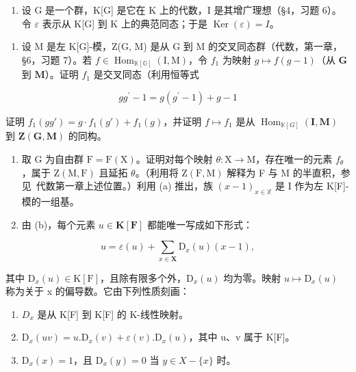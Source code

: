 \begin{enumerate}
\def\labelenumi{\arabic{enumi}.}
\setcounter{enumi}{1}
\tightlist
\item
  设 G 是一个群，K{[}G{]} 是它在 K 上的代数，I 是其增广理想（§4，习题 6）。令 \(\varepsilon\) 表示从 K{[}G{]} 到 K 上的典范同态；于是 \(\operatorname{Ker}(\varepsilon) = I\)。
\end{enumerate}

\begin{enumerate}
\def\labelenumi{(\alph{enumi})}
\tightlist
\item
  设 M 是左 K{[}G{]}-模，Z(G, M) 是从 G 到 M 的交叉同态群（代数，第一章，§6，习题 7）。若 \(f \in \operatorname{Hom}_{\mathbb{K}[\mathbb{G}]}(\mathrm{I}, \mathrm{M})\)，令 \(f_1\) 为映射 \(g \mapsto f(g - 1)\)（从 \(\mathbf{G}\) 到 \(\mathbf{M}\)）。证明 \(f_1\) 是交叉同态（利用恒等式
\end{enumerate}

\[
g g ^ {\prime} - 1 = g (g ^ {\prime} - 1) + g - 1
\]

证明 \(f_{1}(gg') = g \cdot f_{1}(g') + f_{1}(g)\)，并证明 \(f \mapsto f_{1}\) 是从 \(\operatorname{Hom}_{\mathbb{K}[G]}(\mathbf{I}, \mathbf{M})\) 到 \(\mathbf{Z}(\mathbf{G}, \mathbf{M})\) 的同构。

\begin{enumerate}
\def\labelenumi{(\alph{enumi})}
\setcounter{enumi}{1}
\item
  取 G 为自由群 \(\mathrm{F} = \mathrm{F}(\mathrm{X})\)。证明对每个映射 \(\theta: \mathrm{X} \to \mathrm{M}\)，存在唯一的元素 \(f_{\theta}\)，属于 \(\mathrm{Z}(\mathrm{M}, \mathrm{F})\) 且延拓 \(\theta\)。（利用将 \(\mathrm{Z}(\mathrm{F}, \mathrm{M})\) 解释为 F 与 M 的半直积，参见~代数第一章上述位置。）利用 (a) 推出，族 \((x - 1)_{x \in \mathbb{X}}\) 是 I 作为左 K{[}F{]}-模的一组基。
\item
  由 (b)，每个元素 \(u \in \mathbf{K}[\mathbf{F}]\) 都能唯一写成如下形式：
\end{enumerate}

\[
u = \varepsilon (u) + \sum_ {x \in \mathbf {X}} \mathrm{D} _ {x} (u) (x - 1),
\]

其中 \(\mathrm{D}_{x}(u)\in\mathrm{K}[\mathrm{F}]\)，且除有限多个外，\(\mathrm{D}_{x}(u)\) 均为零。映射 \(u\mapsto\mathrm{D}_{x}(u)\) 称为关于 x 的偏导数。它由下列性质刻画：

\begin{enumerate}
\def\labelenumi{(\roman{enumi})}
\item
  \(D_{x}\) 是从 K{[}F{]} 到 K{[}F{]} 的 K-线性映射。
\item
  \(\mathrm{D}_{x}(uv)=u.\mathrm{D}_{x}(v)+\varepsilon(v).\mathrm{D}_{x}(u)\)，其中 u、v 属于 K{[}F{]}。
\item
  \(\mathrm{D}_{x}(x)=1\)，且 \(\mathrm{D}_{x}(y)=0\) 当 \(y\in X-\{x\}\) 时。
\end{enumerate}

